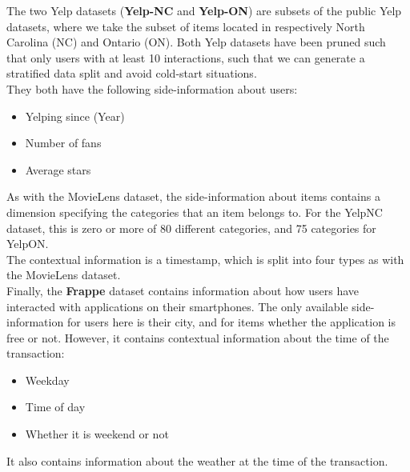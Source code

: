 The two Yelp datasets (\textbf{Yelp-NC} and \textbf{Yelp-ON}) are subsets of the public Yelp datasets, where we take the subset of items located in respectively North Carolina (NC) and Ontario (ON).
Both Yelp datasets have been pruned such that only users with at least 10 interactions, such that we can generate a stratified data split and avoid cold-start situations.\\
They both have the following side-information about users:
\begin{itemize}
    \item Yelping since (Year)
    \item Number of fans
    \item Average stars 
\end{itemize}
As with the MovieLens dataset, the side-information about items contains a dimension specifying the categories that an item belongs to.
For the YelpNC dataset, this is zero or more of 80 different categories, and 75 categories for YelpON.\\
The contextual information is a timestamp, which is split into four types as with the MovieLens dataset.\\
Finally, the \textbf{Frappe} dataset contains information about how users have interacted with applications on their smartphones.
The only available side-information for users here is their city, and for items whether the application is free or not.
However, it contains contextual information about the time of the transaction:
\begin{itemize}
    \item Weekday
    \item Time of day
    \item Whether it is weekend or not
\end{itemize}
It also contains information about the weather at the time of the transaction.

